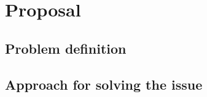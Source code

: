 \chapter{Proposal}
\label{maintwo}

\section{Problem definition}

\section{Approach for solving the issue}

